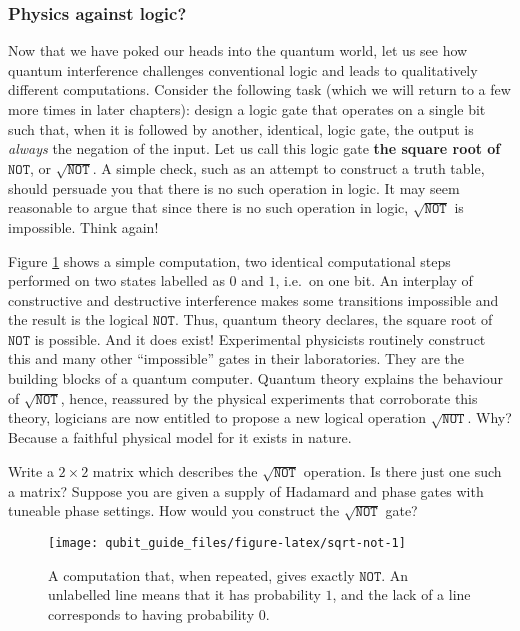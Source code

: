 \documentclass[fleqn]{article}
\begin{document}
\hypertarget{physics-against-logic}{%
\subsubsection{Physics against logic?}\label{physics-against-logic}}

Now that we have poked our heads into the quantum world, let us see how quantum interference challenges conventional logic and leads to qualitatively different computations.
Consider the following task (which we will return to a few more times in later chapters): design a logic gate that operates on a single bit such that, when it is followed by another, identical, logic gate, the output is \emph{always} the negation of the input.
Let us call this logic gate \textbf{the square root of \(\texttt{NOT}\)}, or \(\sqrt{\texttt{NOT}}\).
A simple check, such as an attempt to construct a truth table, should persuade you that there is no such operation in logic.
It may seem reasonable to argue that since there is no such operation in logic, \(\sqrt{\texttt{NOT}}\) is impossible.
Think again!

Figure \ref{fig:sqrt-not} shows a simple computation, two identical computational steps performed on two states labelled as \(0\) and \(1\), i.e.~on one bit.
An interplay of constructive and destructive interference makes some transitions impossible and the result is the logical \(\texttt{NOT}\).
Thus, quantum theory declares, the square root of \(\texttt{NOT}\) is possible.
And it does exist!
Experimental physicists routinely construct this and many other ``impossible'' gates in their laboratories.
They are the building blocks of a quantum computer.
Quantum theory explains the behaviour of \(\sqrt{\texttt{NOT}}\), hence, reassured by the physical experiments that corroborate this theory, logicians are now entitled to propose a new logical operation \(\sqrt{\texttt{NOT}}\).
Why?
Because a faithful physical model for it exists in nature.

Write a \(2\times 2\) matrix which describes the \(\sqrt{\texttt{NOT}}\) operation.
Is there just one such a matrix?
Suppose you are given a supply of Hadamard and phase gates with tuneable phase settings.
How would you construct the \(\sqrt{\texttt{NOT}}\) gate?



\begin{figure}[H]

{\centering \texttt{[image: qubit\_guide\_files/figure-latex/sqrt-not-1]} 

}

\caption{A computation that, when repeated, gives exactly \(\texttt{NOT}\). An unlabelled line means that it has probability \(1\), and the lack of a line corresponds to having probability \(0\).}\label{fig:sqrt-not}
\end{figure}
\end{document}
